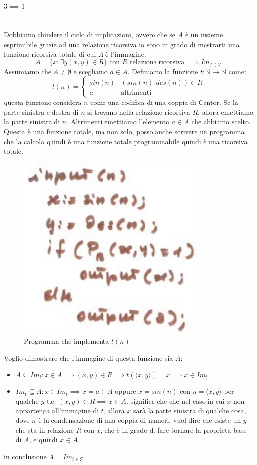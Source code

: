 \documentclass{article}
\begin{document}
\paragraph{$3\implies 1$}\mbox{}\\
Dobbiamo chiudere il ciclo di implicazioni, ovvero che se $A$ è un insieme esprimibile grazie
ad una relazione ricorsiva io sono in grado di mostrarti una funzione ricorsiva totale di cui $A$
è l'immagine.
$$A=\{x:\exists y(x,y)\in R\}\text{ con }R \text{ relazione ricorsiva }\implies Im_{f\in\mathcal{T}}$$
Assumiamo che $A\neq\emptyset$ e scegliamo $a\in A$. Definiamo la funzione $t:\mathbb{N}\rightarrow\mathbb{N}$ come:
\[
    t(n)=
    \begin{cases}
        sin(n) & (sin(n), des(n))\in R\\
        a & \text{altrimenti}
    \end{cases}
\]
questa funzione considera $n$ come una codifica di una coppia di Cantor. Se la parte sinistra e destra di $n$
si trovano nella relazione ricorsiva $R$, allora emettiamo la parte sinistra di $n$. Altrimenti emettiamo
l'elemento $a\in A$ che abbiamo scelto. Questa è una funzione totale, ma non solo, posso anche
scrivere un programma che la calcola quindi è una funzione totale programmabile quindi è una ricorsiva
totale.
\begin{figure}[H]
    \centering
    \includegraphics[scale=0.4]{images/tdin.png}
    \caption{Programma che implementa $t(n)$}
\end{figure}
Voglio dimostrare che l'immagine di questa funzione sia $A$:
\begin{itemize}
    \item $A\subseteq Im_t:x\in A\implies (x,y)\in R\implies t(\langle x,y\rangle)=x\implies x\in Im_t$
    \item $Im_t\subseteq A: x\in Im_t\implies x=a\in A$ oppure $x=sin(n)$ con $n=\langle x,y\rangle$
    per qualche $y$ t.c. $(x,y)\in R\implies x\in A$.
    significa che che nel caso in cui $x$ non appartenga all'immagine di $t$, allora $x$ sarà la parte sinistra di qualche cosa, dove $n$ è la condensazione di una coppia di numeri,
    vuol dire che esiste un $y$ che sta in relazione $R$ con $x$, che è in grado di fare tornare la proprietà
    base di $A$, e quindi $x\in A$.
\end{itemize}
in conclusione $A=Im_{t\in\mathcal{T}}$
\end{document}
